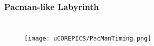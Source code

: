 \documentclass{beamer}
\begin{document}
\begin{frame}
\frametitle{Pacman-like Labyrinth}




\begin{columns}[c]

\begin{figure}
\texttt{[image: uCOREPICS/PacManTiming.png]}
\end{figure}

\begin{itemize}

\end{itemize}



\begin{figure}
\centering
{}\par\medskip
{}\par\medskip        
\end{figure}

\end{columns}


\end{frame}

\begin{comment}
\begin{frame}
\frametitle{Wall Color Predictions}
We paint the first loop green and the second loop blue
\begin{figure}
\texttt{[image: uCOREPICS/MultipleObservations.png]}
\texttt{[image: lucasplots/monImages/doubleLoopImageMO.png]}

\end{figure}

\begin{itemize}

\end{enumerate}

\end{frame}
\end{comment}
\end{document}
